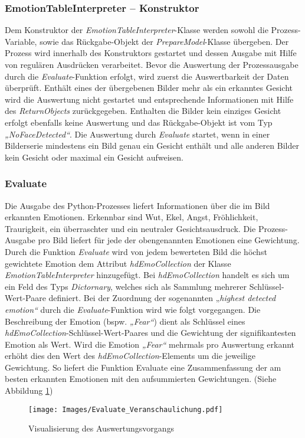 \documentclass[12pt,a4paper,headinclude,twoside, plainheadsepline, open=right,numbers=noenddot]{scrreprt}
\begin{document}
\subsubsection{EmotionTableInterpreter – Konstruktor}
Dem Konstruktor der \textit{EmotionTableInterpreter}-Klasse werden sowohl die Prozess-Variable, sowie das R\"{u}ckgabe-Objekt der \textit{PrepareModel}-Klasse \"{u}bergeben. Der Prozess wird innerhalb des Konstruktors gestartet und dessen Ausgabe mit Hilfe von regul\"{a}ren Ausdr\"{u}cken verarbeitet. Bevor die Auswertung der Prozessausgabe durch die \textit{Evaluate}-Funktion erfolgt, wird zuerst die Auswertbarkeit der Daten \"{u}berpr\"{u}ft. Enth\"{a}lt eines der \"{u}bergebenen Bilder mehr als ein erkanntes Gesicht wird die Auswertung nicht gestartet und entsprechende Informationen mit Hilfe des \textit{ReturnObjects} zur\"{u}ckgegeben. Enthalten die Bilder kein einziges Gesicht erfolgt ebenfalls keine Auswertung und das R\"{u}ckgabe-Objekt ist vom Typ \textit{„NoFaceDetected“}. Die Auswertung durch \textit{Evaluate} startet, wenn in einer Bilderserie mindestens ein Bild genau ein Gesicht enth\"{a}lt und alle anderen Bilder kein Gesicht oder maximal ein Gesicht aufweisen.
\subsubsection{Evaluate}
Die Ausgabe des Python-Prozesses liefert Informationen \"{u}ber die im Bild erkannten Emotionen. Erkennbar sind Wut, Ekel, Angst, Fr\"{o}hlichkeit, Traurigkeit, ein \"{u}berraschter und ein neutraler Gesichtsausdruck. Die Prozess-Ausgabe pro Bild liefert f\"{u}r jede der obengenannten Emotionen eine Gewichtung. Durch die Funktion \textit{Evaluate} wird von jedem bewerteten Bild die h\"{o}chst gewichtete Emotion dem Attribut \textit{hdEmoCollection} der Klasse \textit{EmotionTableInterpreter} hinzugef\"{u}gt. Bei \textit{hdEmoCollection} handelt es sich um ein Feld des Typs \textit{Dictornary}, welches sich als Sammlung mehrerer Schl\"{u}ssel-Wert-Paare definiert. Bei der Zuordnung der sogenannten „\textit{highest detected emotion“} durch die \textit{Evaluate}-Funktion wird wie folgt vorgegangen. Die Beschreibung der Emotion (bspw. \textit{„Fear“}) dient als Schl\"{u}ssel eines \textit{hdEmoCollection}-Schl\"{u}ssel-Wert-Paares und die Gewichtung der signifikantesten Emotion als Wert. Wird die Emotion \textit{„Fear“} mehrmals pro Auswertung erkannt erh\"{o}ht dies den Wert des \textit{hdEmoCollection}-Elements um die jeweilige Gewichtung. So liefert die Funktion Evaluate eine Zusammenfassung der am besten erkannten Emotionen mit den aufsummierten Gewichtungen. (Siehe Abbildung \ref{fig:VisualisierungEvaluation})
 \begin{figure}
 \texttt{[image: Images/Evaluate\_Veranschaulichung.pdf]}
 \caption{Visualisierung des Auswertungsvorgangs}
 \label{fig:VisualisierungEvaluation}
 \end{figure}
\end{document}
